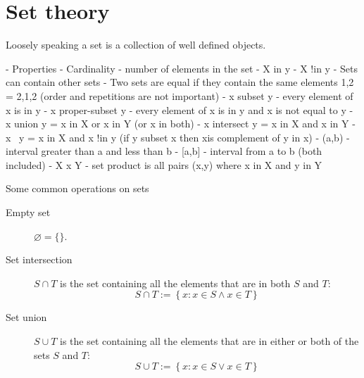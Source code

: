 \chapter{Set theory}

Loosely speaking a set is a collection of well defined objects. 

- Properties
    - Cardinality - number of elements in the set
    - X in y
    - X !in y
    - Sets can contain other sets
    - Two sets are equal if they contain the same elements {1,2} = {2,1,2} (order and repetitions are not important)
    - x subset y - every element of x is in y
    - x proper-subset y - every element of x is in y and x is not equal to y
    - x union y = x in X or x in Y (or x in both)
    - x intersect y = x in X and x in Y
    - x \ y = x in X and x !in y (if y subset x then x\y is complement of y in x)
    - (a,b) - interval greater than a and less than b
    - [a,b] - interval from a to b (both included)
    - X x Y - set product is all pairs (x,y) where x in X and y in Y

Some common operations on sets
\begin{description}
\item[Empty set] $\varnothing = \{\}$.
\item[Set intersection] $S \cap T$ is the set containing all the elements that are in both $S$ and $T$:
\begin{equation}
S \cap T := \left\{{x: x \in S \land x \in T}\right\}
\end{equation}
\item[Set union] $S \cup T$ is the set containing all the elements that are in either or both of the sets $S$ and $T$:
\begin{equation}
S \cup T := \left\{{x: x \in S \lor x \in T}\right\}
\end{equation}
\end{description}



